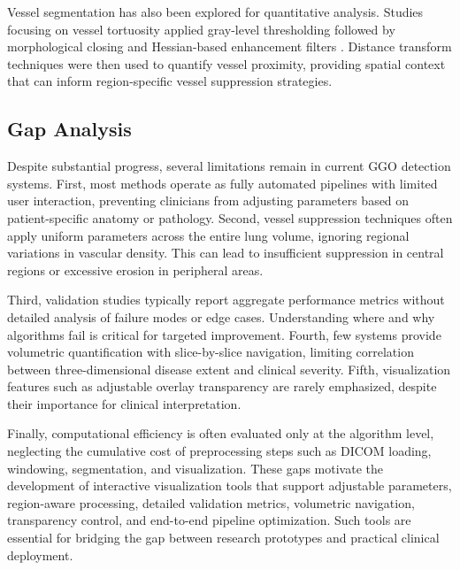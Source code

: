Vessel segmentation has also been explored for quantitative analysis. Studies focusing on vessel tortuosity applied gray-level
thresholding followed by morphological closing and Hessian-based enhancement filters \cite{pmc2014}. Distance transform techniques
were then used to quantify vessel proximity, providing spatial context that can inform region-specific vessel suppression strategies.

\subsection{Gap Analysis}

Despite substantial progress, several limitations remain in current GGO detection systems. First, most methods operate as fully
automated pipelines with limited user interaction, preventing clinicians from adjusting parameters based on patient-specific
anatomy or pathology. Second, vessel suppression techniques often apply uniform parameters across the entire lung volume,
ignoring regional variations in vascular density. This can lead to insufficient suppression in central regions or excessive erosion
in peripheral areas.

Third, validation studies typically report aggregate performance metrics without detailed analysis of failure modes or edge cases.
Understanding where and why algorithms fail is critical for targeted improvement. Fourth, few systems provide volumetric quantification
with slice-by-slice navigation, limiting correlation between three-dimensional disease extent and clinical severity. Fifth, visualization
features such as adjustable overlay transparency are rarely emphasized, despite their importance for clinical interpretation.

Finally, computational efficiency is often evaluated only at the algorithm level, neglecting the cumulative cost of preprocessing
steps such as DICOM loading, windowing, segmentation, and visualization. These gaps motivate the development of interactive
visualization tools that support adjustable parameters, region-aware processing, detailed validation metrics, volumetric navigation,
transparency control, and end-to-end pipeline optimization. Such tools are essential for bridging the gap between research prototypes
and practical clinical deployment.
